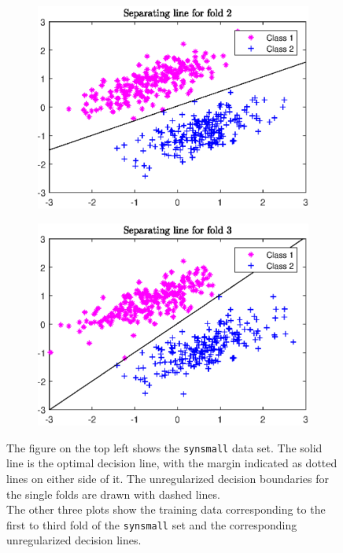 \begin{figure}[ht]
\begin{subfigure}[t]{0.49\textwidth}
		\includegraphics[width=\textwidth]{Pictures/Plots/Fold_2.eps}
	\end{subfigure}
	\begin{subfigure}[t]{0.49\textwidth}
			\includegraphics[width=\textwidth]{Pictures/Plots/Fold_3.eps}
	\end{subfigure}

	\caption[Overfitting]{The figure on the top left shows the \textup{\texttt{synsmall}} data set. The solid line is the optimal decision line, with the margin indicated as dotted lines on either side of it. The unregularized decision boundaries for the single folds are drawn with dashed lines. \\
	The other three plots show the training data corresponding to the first to third fold of the \textup{\texttt{synsmall}} set and the corresponding unregularized decision lines.}
	\label{fig_synsmall}
\end{figure}

